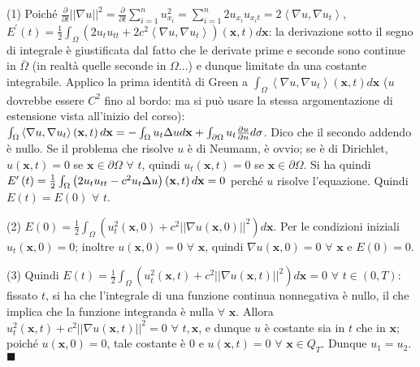 \documentclass{article}
\begin{document}
(1) Poich\'{e} $\frac{\partial }{\partial t}\left\vert \left\vert \nabla
u\right\vert \right\vert ^{2}=\frac{\partial }{\partial t}%
\sum_{i=1}^{n}u_{x_{i}}^{2}=\sum_{i=1}^{n}2u_{x_{i}}u_{x_{i}t}=2\left\langle
\nabla u,\nabla u_{t}\right\rangle $, $E^{\prime }\left( t\right) =\frac{1}{2%
}\int_{\Omega }\left( 2u_{t}u_{tt}+2c^{2}\left\langle \nabla u,\nabla
u_{t}\right\rangle \right) \left( \mathbf{x},t\right) d\mathbf{x}$: la
derivazione sotto il segno di integrale \`{e} giustificata dal fatto che le
derivate prime e seconde sono continue in $\bar{\Omega}$ (in realt\`{a}
quelle seconde in $\Omega $...) e dunque limitate da una costante
integrabile. Applico la prima identit\`{a} di Green a $\int_{\Omega
}\left\langle \nabla u,\nabla u_{t}\right\rangle \left( \mathbf{x},t\right) d%
\mathbf{x}$ ($u$ dovrebbe essere $C^{2}$ fino al bordo: ma si pu\`{o} usare
la stessa argomentazione di estensione vista all'inizio del corso): $%
\int_{\Omega }\left\langle \nabla u,\nabla u_{t}\right\rangle \left( \mathbf{%
x},t\right) d\mathbf{x}=-\int_{\Omega }u_{t}\Delta ud\mathbf{x}%
+\int_{\partial \Omega }u_{t}\frac{\partial u}{\partial n}d\sigma $. Dico
che il secondo addendo \`{e} nullo. Se il problema che risolve $u$ \`{e} di
Neumann, \`{e} ovvio; se \`{e} di Dirichlet, $u\left( \mathbf{x},t\right) =0$
se $\mathbf{x}\in \partial \Omega $ $\forall $ $t$, quindi $u_{t}\left( 
\mathbf{x},t\right) =0$ se $\mathbf{x}\in \partial \Omega $. Si ha quindi $E^{\prime }\left( t\right) =\frac{%
1}{2}\int_{\Omega }\left( 2u_{t}u_{tt}-c^{2}u_{t}\Delta u\right) \left( 
\mathbf{x},t\right) d\mathbf{x}=0$ perch\'{e} $u$ risolve l'equazione.
Quindi $E\left( t\right) =E\left( 0\right) $ $\forall $ $t$.

(2) $E\left( 0\right) =\frac{1}{2}\int_{\Omega }\left( u_{t}^{2}\left( 
\mathbf{x},0\right) +c^{2}\left\vert \left\vert \nabla u\left( \mathbf{x}%
,0\right) \right\vert \right\vert ^{2}\right) d\mathbf{x}$. Per le
condizioni iniziali $u_{t}\left( \mathbf{x},0\right) =0$; inoltre $u\left( 
\mathbf{x},0\right) =0$ $\forall $ $\mathbf{x}$, quindi $\nabla u\left( 
\mathbf{x},0\right) =0$ $\forall $ $\mathbf{x}$ e $E\left( 0\right) =0$.

(3) Quindi $E\left( t\right) =\frac{1}{2}\int_{\Omega }\left(
u_{t}^{2}\left( \mathbf{x},t\right) +c^{2}\left\vert \left\vert \nabla
u\left( \mathbf{x},t\right) \right\vert \right\vert ^{2}\right) d\mathbf{x}%
=0 $ $\forall $ $t\in \left( 0,T\right) $: fissato $t$, si ha che
l'integrale di una funzione continua nonnegativa \`{e} nullo, il che implica
che la funzione integranda \`{e} nulla $\forall $ $\mathbf{x}$. Allora $%
u_{t}^{2}\left( \mathbf{x},t\right) +c^{2}\left\vert \left\vert \nabla
u\left( \mathbf{x},t\right) \right\vert \right\vert ^{2}=0$ $\forall $ $t,%
\mathbf{x}$, e dunque $u$ \`{e} costante sia in $t$ che in $\mathbf{x}$;
poich\'{e} $u\left( \mathbf{x},0\right) =0$, tale costante \`{e} $0$ e $%
u\left( \mathbf{x},t\right) =0$ $\forall $ $\mathbf{x}\in Q_{T}$. Dunque $%
u_{1}=u_{2}$. $\blacksquare $
\end{document}
